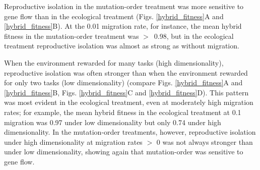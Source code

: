 \begin{doublespace}
Reproductive isolation in the mutation-order treatment
was more sensitive to gene flow than in the ecological treatment
(Figs. \ref{hybrid_fitness}A and \ref{hybrid_fitness}B).
%
At the 0.01 migration rate, for instance,
the mean hybrid fitness in the mutation-order treatment was $>$~0.98,
but in the ecological treatment reproductive isolation
was almost as strong as without migration.



When the environment rewarded for many tasks (high dimensionality),
reproductive isolation was often stronger than
when the environment rewarded for only two tasks (low dimensionality)
(compare Figs. \ref{hybrid_fitness}A and \ref{hybrid_fitness}B,
Figs. \ref{hybrid_fitness}C and \ref{hybrid_fitness}D).
%
This pattern was most evident in the ecological treatment,
even at moderately high migration rates;
for example, the mean hybrid fitness in the ecological treatment
at 0.1 migration was 0.97 under low dimensionality %
but only 0.74 under high dimensionality. %
%
In the mutation-order treatments, however,
reproductive isolation under high dimensionality at migration rates $>$ 0
was not always stronger than under low dimensionality,
showing again that mutation-order was sensitive to gene flow.




\end{doublespace}

